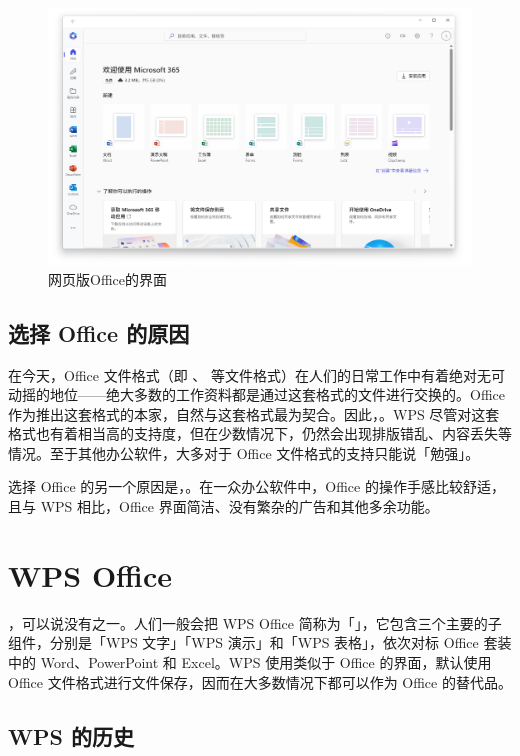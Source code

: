 \begin{figure}[htb!]
  \centering
  \includegraphics[width=.67\textwidth]{assets/software/Fake_Office_2.png}
  \caption{网页版Office的界面}
  \label{fig:Fake_Office_2}
\end{figure}

\subsection{选择 Office 的原因}

在今天，Office 文件格式（即 、 等文件格式）在人们的日常工作中有着绝对无可动摇的地位——绝大多数的工作资料都是通过这套格式的文件进行交换的。Office 作为推出这套格式的本家，自然与这套格式最为契合。因此，。WPS 尽管对这套格式也有着相当高的支持度，但在少数情况下，仍然会出现排版错乱、内容丢失等情况。至于其他办公软件，大多对于 Office 文件格式的支持只能说「勉强」。

选择 Office 的另一个原因是，。在一众办公软件中，Office 的操作手感比较舒适，且与 WPS 相比，Office 界面简洁、没有繁杂的广告和其他多余功能。

\section{WPS Office}

，可以说没有之一。人们一般会把 WPS Office 简称为「」，它包含三个主要的子组件，分别是「WPS 文字」「WPS 演示」和「WPS 表格」，依次对标 Office 套装中的 Word、PowerPoint 和 Excel。WPS 使用类似于 Office 的界面，默认使用 Office 文件格式进行文件保存，因而在大多数情况下都可以作为 Office 的替代品。

\subsection{WPS 的历史}


